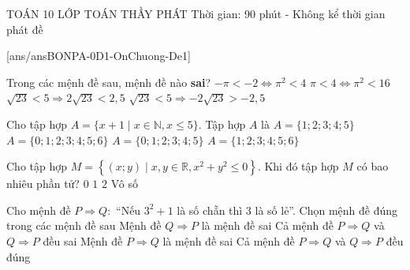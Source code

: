\begin{name}
	{\tenchude}
	{TOÁN 10}
	{LỚP TOÁN THẦY PHÁT}
	{Thời gian: 90 phút - Không kể thời gian phát đề}
\end{name}
\TN
{}[ans/ansBONPA-0D1-OnChuong-De1]
\begin{ex}%
Trong các mệnh đề sau, mệnh đề nào \textbf{sai}?
\choice
{\True $-\pi<-2\Leftrightarrow\pi^2<4$}
{$\pi<4\Leftrightarrow\pi^2<16$}
{$\sqrt{23}<5\Rightarrow2\sqrt{23}<2{,}5$}
{$\sqrt{23}<5\Rightarrow-2\sqrt{23}>-2{,}5$}
\end{ex}

\begin{ex}%
Cho tập hợp $A=\{x+1\mid x\in\mathbb{N}, x\le 5\}$. Tập hợp $A$ là
\choice
{$A=\{1;2;3;4;5\}$}
{$A=\{0;1;2;3;4;5;6\}$}
{$A=\{0;1;2;3;4;5\}$}
{\True $A=\{1;2;3;4;5;6\}$}
\end{ex}

\begin{ex}%
Cho tập hợp $M=\left\{(x;y)\mid x,y\in\mathbb{R}, x^2+y^2\le0\right\}$. Khi đó tập hợp $M$ có bao nhiêu phần tử?
\choice
{$0$}
{\True $1$}
{$2$}
{Vô số}
\end{ex}

\begin{ex}%
Cho mệnh đề $P\Rightarrow Q\colon$ ``Nếu $3^2+1$ là số chẵn thì $3$ là số lẻ''. Chọn mệnh đề đúng trong các mệnh đề sau
\choice
{Mệnh đề $Q\Rightarrow P$ là mệnh đề sai}
{Cả mệnh đề $P\Rightarrow Q$ và $Q\Rightarrow P$ đều sai}
{Mệnh đề $P\Rightarrow Q$ là mệnh đề sai}
{\True Cả mệnh đề $P\Rightarrow Q$ và $Q\Rightarrow P$ đều đúng}
\end{ex}

